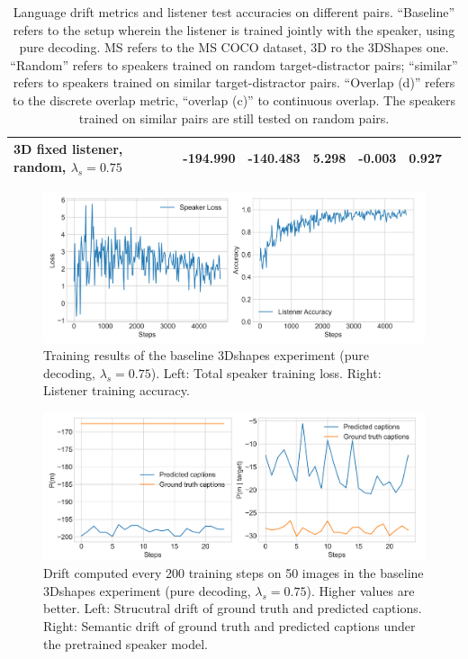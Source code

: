 \begin{table}[]
\begin{tabularx}{\textwidth}{|X|l|l|X|X|X|X|}
		3D fixed listener, random, $\lambda_s = 0.75$&      -194.990          &     -140.483                  &             5.298         &         -0.003            &                   0.927                      &                                           \\ \hline
	\end{tabularx}
	\caption{\label{tab:3dshapes_drift_metrics_basic_baseline} Language drift metrics and listener test accuracies on different pairs. 
		``Baseline'' refers to the setup wherein the listener is trained jointly with the speaker, using pure decoding. MS refers to the MS COCO dataset, 3D ro the 3DShapes one. ``Random'' refers to speakers trained on random target-distractor pairs; ``similar'' refers to speakers trained on similar target-distractor pairs. ``Overlap (d)'' refers to the discrete overlap metric, ``overlap (c)'' to continuous overlap. The speakers trained on similar pairs are still tested on random pairs.}
\end{table}


\begin{figure}[h]
	\centering
	\includegraphics[width=\linewidth]{images/3dshapes_refgame_49_pure_075.png}
	\caption{Training results of the baseline 3Dshapes experiment (pure decoding, $\lambda_s = 0.75$). Left: Total speaker training loss. Right: Listener training accuracy.}
	\label{fig:3dshapes_baseline_075_speaker_loss_listener_acc}
\end{figure}


\begin{figure}
	\centering
	\includegraphics[width=\linewidth]{images/3dshapes_structural_semantic_drift_49_pure_075_random.png}
	\caption{Drift computed every 200 training steps on 50 images in the baseline 3Dshapes experiment (pure decoding, $\lambda_s = 0.75$). Higher values are better. Left: Strucutral drift of ground truth and predicted captions. Right: Semantic drift of ground truth and predicted captions under the pretrained speaker model.} 
	\label{fig:3dshapes_baseline_075_str_drift}
\end{figure}

